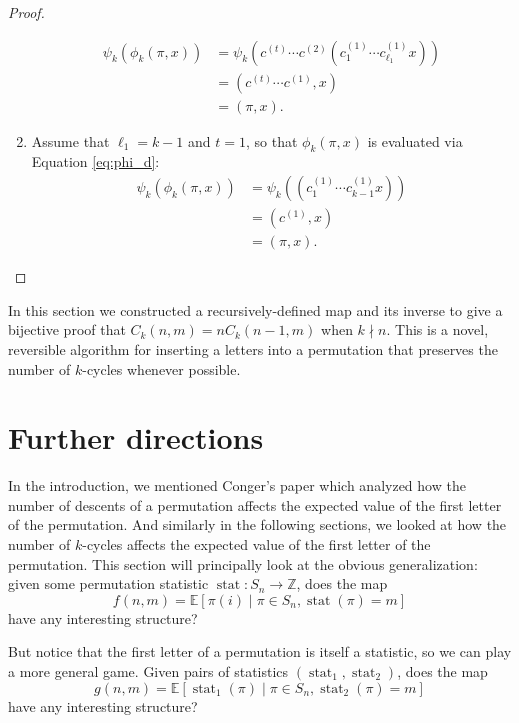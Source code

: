\begin{proof}
\begin{enumerate}[leftmargin=*, label={\textbf{Case \arabic*.}}]
\begin{align}
      \psi_k(\phi_k(\pi, x))
      &= \psi_k(c^{(t)} \cdots c^{(2)} (c^{(1)}_1 \cdots c^{(1)}_{\ell_1} x)) \\
      &= (c^{(t)}\cdots c^{(1)},x) \\
      &= (\pi, x).
    \end{align}
    \item Assume that $\ell_1 = k-1$ and $t = 1$, so that $\phi_k(\pi,x)$ is evaluated via Equation \ref{eq:phi_d}: \begin{align}
      \psi_k(\phi_k(\pi, x))
      &= \psi_k((c^{(1)}_1 \cdots c^{(1)}_{k-1  } x)) \\
      &= (c^{(1)},x) \\
      &= (\pi, x).
    \end{align}
  \end{enumerate}
\end{proof}
In this section we constructed a recursively-defined map and its inverse to
give a bijective proof that $C_k(n,m) = nC_k(n-1,m)$ when $k \nmid n$. This
is a novel, reversible algorithm for inserting a letters into a permutation
that preserves the number of $k$-cycles whenever possible.
\section{Further directions}
\label{section:furtherDirections}
In the introduction, we mentioned Conger's paper which analyzed how the number
of descents of a permutation affects the expected value of the first letter
of the permutation.
And similarly in the following sections, we looked at how the number of $k$-cycles
affects the expected value of the first letter of the permutation.
This section will principally look at the obvious generalization: given some
permutation statistic $\operatorname{stat}\colon S_n \rightarrow \mathbb Z$,
does the map \begin{equation}
  f(n,m) = \mathbb E[\pi(i) \mid \pi \in S_n, \operatorname{stat}(\pi)=m]
\end{equation} have any interesting structure?

But notice that the first letter of a permutation is itself a statistic, so
we can play a more general game. Given pairs of statistics
$(\operatorname{stat}_1, \operatorname{stat}_2)$, does the map
\begin{equation}
  g(n,m) = \mathbb E[\operatorname{stat}_1(\pi) \mid \pi \in S_n, \operatorname{stat}_2(\pi)=m]
\end{equation} have any interesting structure?

